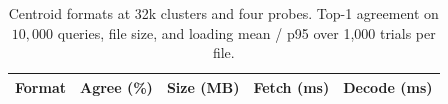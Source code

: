\begin{table}[H]
\centering\normalsize\renewcommand{\arraystretch}{1.2}\setlength{\tabcolsep}{3.5pt}
\setlength{\arrayrulewidth}{0.3pt}
\caption{Centroid formats at 32k clusters and four probes. Top-1 agreement on $10{,}000$ queries, file size, and loading mean / p95 over 1,000 trials per file.}
\label{tab:compression-table}
\begin{tabular}{|l|c|c|c|c|}
\hline
Format & Agree (\%) & Size (MB) & Fetch (ms) & Decode (ms)\\\hline

\end{tabular}
\end{table}
